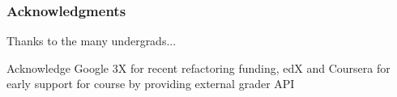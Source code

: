 \subsubsection*{Acknowledgments}  %


Thanks to the many undergrads...

Acknowledge Google 3X for recent refactoring funding, edX and Coursera for early
support for course by providing external grader API

